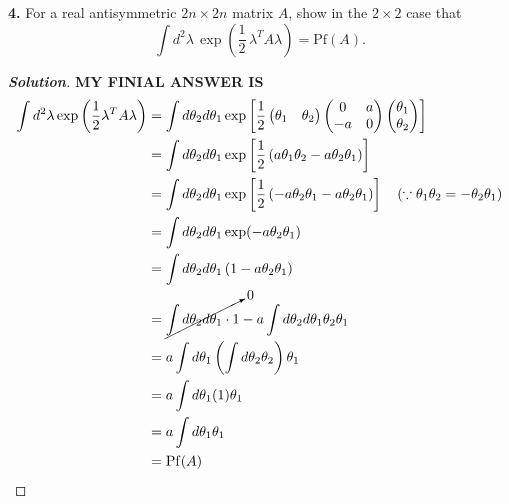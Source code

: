 \documentclass[11pt]{article}
\newenvironment{solution}[1][]{\begin{proof}[\textbf{Solution}]}{\end{proof}}
\begin{document}
\begin{tcolorbox}[problem]
\textbf{4.} For a real antisymmetric $2n\times 2n$ matrix $A$, show in the $2\times 2$ case that $$\int d^2\lambda\,\exp\!\left(\frac12\,\lambda^T A\lambda\right)=\mathrm{Pf}(A).$$
\end{tcolorbox}
\begin{solution}[12.4]
	\textbf{MY FINIAL ANSWER IS}
	\[
	\begin{aligned}
		\int d^2\lambda \exp\left(\frac{1}{2}\lambda^T A \lambda\right)
		&= \int d\theta_2 d\theta_1 \exp\left[ \frac{1}{2} \begin{pmatrix} \theta_1 & \theta_2 \end{pmatrix} \begin{pmatrix} 0 & a \\ -a & 0 \end{pmatrix} \begin{pmatrix} \theta_1 \\ \theta_2 \end{pmatrix} \right] \\
		&= \int d\theta_2 d\theta_1 \exp\left[ \frac{1}{2} \left( a\theta_1\theta_2 - a\theta_2\theta_1 \right) \right] \\
		&= \int d\theta_2 d\theta_1 \exp\left[ \frac{1}{2} \left( -a\theta_2\theta_1 - a\theta_2\theta_1 \right) \right] \quad (\because \theta_1\theta_2 = -\theta_2\theta_1) \\
		&= \int d\theta_2 d\theta_1 \exp(-a\theta_2\theta_1) \\
		&= \int d\theta_2 d\theta_1 \left( 1 - a\theta_2\theta_1 \right) \quad \\
		&= \cancelto{0}{\int d\theta_2 d\theta_1 \cdot 1} - a \int d\theta_2 d\theta_1 \theta_2 \theta_1 \\
		&= a \int d\theta_1 \left( \int d\theta_2 \theta_2 \right) \theta_1 \\
		&= a \int d\theta_1 (1) \theta_1 \\
		&= a \int d\theta_1 \theta_1 \\
		&= \mathrm{Pf}(A)
	\end{aligned}
	\]
\end{solution}
\end{document}
